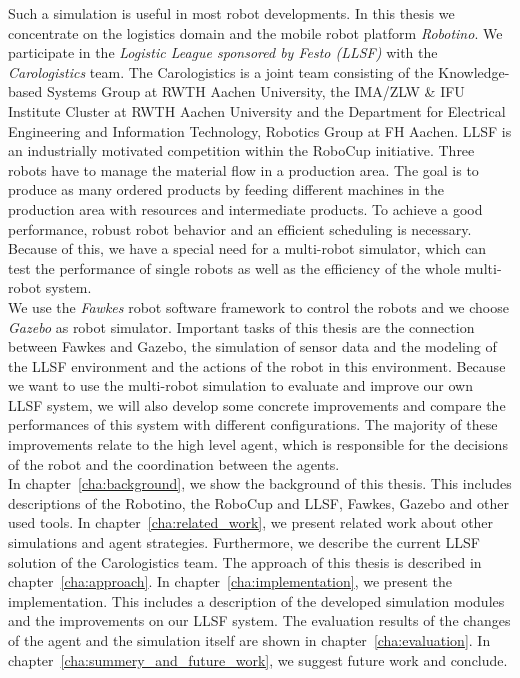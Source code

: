 Such a simulation is useful in most robot developments. In this thesis we concentrate on the logistics domain and the mobile robot platform \textit{Robotino}. We participate in the \textit{Logistic League sponsored by Festo (LLSF)} with the \textit{Carologistics} team. The Carologistics is a joint team consisting of the Knowledge-based Systems Group at RWTH Aachen University, the IMA/ZLW \& IFU Institute Cluster at RWTH Aachen University and the Department for Electrical Engineering and Information Technology, Robotics Group at FH Aachen. LLSF is an industrially motivated competition within the RoboCup initiative. Three robots have to manage the material flow in a production area. The goal is to produce as many ordered products by feeding different machines in the production area with resources and intermediate products. To achieve a good performance, robust robot behavior and an efficient scheduling is necessary. Because of this, we have a special need for a multi-robot simulator, which can test the performance of single robots as well as the efficiency of the whole multi-robot system.\\
We use the \textit{Fawkes} robot software framework to control the robots and we choose \textit{Gazebo} as robot simulator. Important tasks of this thesis are the connection between Fawkes and Gazebo, the simulation of sensor data and the modeling of the LLSF environment and the actions of the robot in this environment. Because we want to use the multi-robot simulation to evaluate and improve our own LLSF system, we will also develop some concrete improvements and compare the performances of this system with different configurations. The majority of these improvements relate to the high level agent, which is responsible for the decisions of the robot and the coordination between the agents.
\\
In chapter~\ref{cha:background}, we show the background of this thesis. This includes descriptions of the Robotino, the RoboCup and LLSF, Fawkes, Gazebo and other used tools. In chapter~\ref{cha:related_work}, we present related work about other simulations and agent strategies. Furthermore, we describe the current LLSF solution of the Carologistics team. The approach of this thesis is described in chapter~\ref{cha:approach}. In chapter~\ref{cha:implementation}, we present the implementation. This includes a description of the developed simulation modules and the improvements on our LLSF system. The evaluation results of the changes of the agent and the simulation itself are shown in chapter~\ref{cha:evaluation}. In chapter~\ref{cha:summery_and_future_work}, we suggest future work and conclude.
